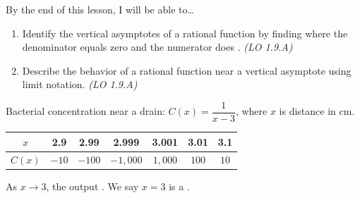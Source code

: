 \documentclass[10pt]{article}
\begin{document}
\namedateperiod

\vspace{0.1in}

\begin{objectivebox}
By the end of this lesson, I will be able to\ldots
\begin{enumerate}[itemsep=2pt]
  \item Identify the vertical asymptotes of a rational function by finding where the denominator
        equals zero and the numerator does \blank{1.5cm}. \hfill\textit{(LO 1.9.A)}
  \item Describe the behavior of a rational function near a vertical asymptote using
        \blank{3cm} limit notation. \hfill\textit{(LO 1.9.A)}
\end{enumerate}
\end{objectivebox}

\vspace{0.1in}

\begin{vocabbox}
\end{vocabbox}

\vspace{0.1in}

\begin{hookbox}
Bacterial concentration near a drain: $C(x) = \dfrac{1}{x - 3}$, where $x$ is distance in cm.

\smallskip
\renewcommand{\arraystretch}{1.3}
\begin{tabular}{|c|c|c|c|c|c|c|}
\hline
$x$    & 2.9 & 2.99 & 2.999 & 3.001 & 3.01 & 3.1 \\
\hline
$C(x)$ & $-10$ & $-100$ & $-1{,}000$ & $1{,}000$ & $100$ & $10$ \\
\hline
\end{tabular}
\smallskip

As $x \to 3$, the output \blank{3.5cm}. We say $x = 3$ is a \blank{3.5cm}.
\end{hookbox}

\vspace{0.1in}
\end{document}
